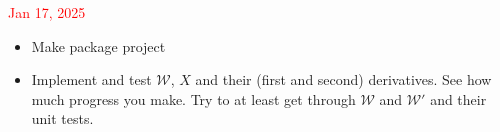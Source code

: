 \documentclass{article}
\newcommand{\sW}{\mathscr{W}}
\begin{document}
\textcolor{red}{Jan 17, 2025}
\begin{itemize}
    \item Make package project
    \item Implement and test $\sW$, $X$ and their (first and second) derivatives. See how much progress you make. Try to at least get through $\sW$ and $\sW'$ and their unit tests. 
\end{itemize}
        



\end{document}
